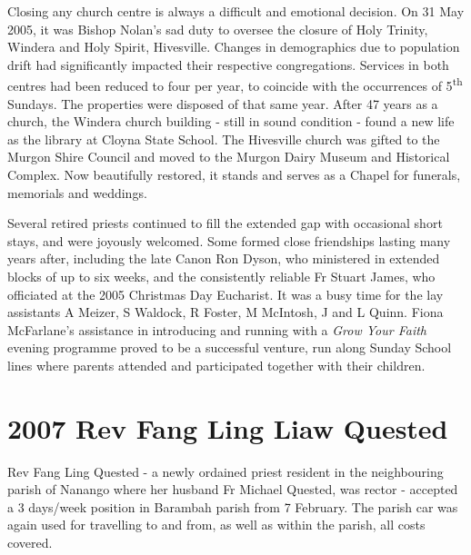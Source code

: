 Closing any church centre is always a difficult and emotional decision. On 31 May 2005, it was Bishop Nolan's sad duty to oversee the closure of Holy Trinity, Windera and Holy Spirit, Hivesville. Changes in demographics due to population drift had significantly impacted their respective congregations. Services in both centres had been reduced to four per year, to coincide with the occurrences of 5\textsuperscript{th} Sundays. The properties were disposed of that same year. After 47 years as a church, the Windera church building - still in sound condition - found a new life as the library at Cloyna State School. The Hivesville church was gifted to the Murgon Shire Council and moved to the Murgon Dairy Museum and Historical Complex. Now beautifully restored, it stands and serves as a Chapel for funerals, memorials and weddings.



Several retired priests continued to fill the extended gap with occasional short stays, and were joyously welcomed. Some formed close friendships lasting many years after, including the late Canon Ron Dyson, who ministered in extended blocks of up to six weeks, and the consistently reliable Fr Stuart James, who officiated at the 2005 Christmas Day Eucharist. It was a busy time for the lay assistants A Meizer, S Waldock, R Foster, M McIntosh, J and L Quinn. Fiona McFarlane's assistance in introducing and running with a \emph{Grow Your Faith} evening programme proved to be a successful venture, run along Sunday School lines where parents attended and participated together with their children.



\section{2007 Rev Fang Ling Liaw Quested}



Rev Fang Ling Quested - a newly ordained priest resident in the neighbouring parish of Nanango where her husband Fr Michael Quested, was rector - accepted a 3 days/week position in Barambah parish from 7 February. The parish car was again used for travelling to and from, as well as within the parish, all costs covered.



